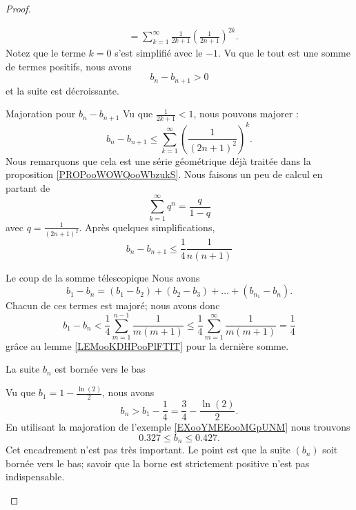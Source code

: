 \begin{proof}
\begin{subproof}
\begin{subequations}
\begin{align}
                    &=\sum_{k=1}^{\infty}  \frac{1}{ 2k+1 }  \left( \frac{1}{ 2n+1 } \right)^{2k}.
                \end{align}
            \end{subequations}
            Notez que le terme \( k=0\) s'est simplifié avec le \( -1\). Vu que le tout est une somme de termes positifs, nous avons
            \begin{equation}
                b_n-b_{n+1}>0
            \end{equation}
            et la suite est décroissante.
        \item[Majoration pour \( b_n-b_{n+1}\)]
            Vu que \( \frac{1}{ 2k+1 }<1\), nous pouvons majorer :
            \begin{equation}
                b_n-b_{n+1}\leq \sum_{k=1}^{\infty}\left( \frac{1}{ (2n+1)^2 } \right)^k.
            \end{equation}
            Nous remarquons que cela est une série géométrique déjà traitée dans la proposition \ref{PROPooWOWQooWbzukS}. Nous faisons un peu de calcul en partant de 
            \begin{equation}
                \sum_{k=1}^{\infty}q^n=\frac{ q }{ 1-q }
            \end{equation}
            avec \( q=\frac{1}{ (2n+1)^2 }\). Après quelques simplifications,
            \begin{equation}
                b_n-b_{n+1}\leq \frac{1}{ 4 }\frac{ 1 }{ n(n+1) }
            \end{equation}
        \item[Le coup de la somme télescopique]
            Nous avons
            \begin{equation}
                b_1-b_n=(b_1-b_2)+(b_2-b_3)+\ldots+(b_{n_1}-b_n).
            \end{equation}
            Chacun de ces termes est majoré; nous avons donc
            \begin{equation}
                b_1-b_n<\frac{1}{ 4 }\sum_{m=1}^{n-1}\frac{1}{ m(m+1) }\leq \frac{1}{ 4 }\sum_{m=1}^{\infty}\frac{1}{ m(m+1) }=\frac{1}{ 4 }
            \end{equation}
            grâce au lemme \ref{LEMooKDHPooPlFTIT} pour la dernière somme.
        \item[La suite \( b_n\) est bornée vers le bas]

            Vu que \( b_1=1-\frac{ \ln(2) }{2}\), nous avons
            \begin{equation}
                b_n>b_1-\frac{1}{ 4 }=\frac{ 3 }{ 4 }-\frac{ \ln(2) }{ 2 }.
            \end{equation}
            En utilisant la majoration de l'exemple \ref{EXooYMEEooMGpUNM} nous trouvons
            \begin{equation}
                0.327\leq b_n\leq 0.427.
            \end{equation}
            Cet encadrement n'est pas très important. Le point est que la suite \( (b_n)\) soit bornée vers le bas; savoir que la borne est strictement positive n'est pas indispensable.


\end{subproof}
\end{proof}
